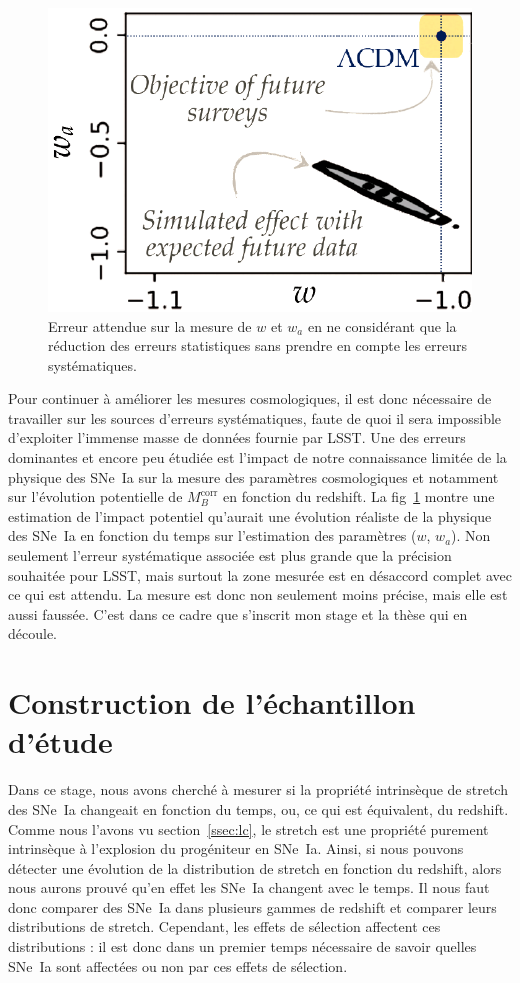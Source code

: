 \documentclass[a4paper, 12pt, svgnames]{article}
\begin{document}
\begin{figure}[htbp!]
    \centering
    \includegraphics[width=.5\linewidth]{Rapport_figures/error.pdf}
    \captionsetup{justification=centering}
    \caption{Erreur attendue sur la mesure de $w$ et $w_a$ en ne considérant
    que la réduction des erreurs statistiques sans prendre en compte les erreurs
    systématiques.}
    \label{fig:err_syst}
\end{figure}

Pour continuer à améliorer les mesures cosmologiques, il est donc nécessaire de
travailler sur les sources d'erreurs systématiques, faute de quoi il sera
impossible d'exploiter l'immense masse de données fournie par LSST. Une des
erreurs dominantes et encore peu étudiée est l'impact de notre connaissance
limitée de la physique des SNe~Ia sur la mesure des paramètres cosmologiques
\cite{rigault_strong_2018} et notamment sur l'évolution potentielle de
$M_B^{\mathrm{corr}}$ en fonction du redshift. La fig~\ref{fig:err_syst} montre
une estimation de l'impact potentiel qu'aurait une évolution réaliste de la
physique des SNe~Ia en fonction du temps sur l'estimation des paramètres ($w$,
$w_a$).  Non seulement l'erreur systématique associée est plus grande que la
précision souhaitée pour LSST, mais surtout la zone mesurée est en désaccord
complet avec ce qui est attendu. La mesure est donc non seulement moins précise,
mais elle est aussi faussée. C'est dans ce cadre que s'inscrit mon stage et la
thèse qui en découle.

\section{Construction de l'échantillon d'étude}\label{sec:complet}

Dans ce stage, nous avons cherché à mesurer si la propriété intrinsèque de
stretch des SNe~Ia changeait en fonction du temps, ou, ce qui est équivalent, du
redshift. Comme nous l'avons vu section~\ref{ssec:lc}, le stretch est une
propriété purement intrinsèque à l'explosion du progéniteur en SNe~Ia. Ainsi, si
nous pouvons détecter une évolution de la distribution de stretch en fonction du
redshift, alors nous aurons prouvé qu'en effet les SNe~Ia changent avec le
temps. Il nous faut donc comparer des SNe~Ia dans plusieurs gammes de redshift
et comparer leurs distributions de stretch. Cependant, les effets de sélection
affectent ces distributions : il est donc dans un premier temps
nécessaire de savoir quelles SNe~Ia sont affectées ou non par ces effets de
sélection. \bigbreak
\end{document}
